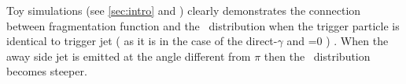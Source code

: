 Toy simulations (see \ref{sec:intro} and ) clearly demonstrates the connection between fragmentation function and the \xe\ distribution when the trigger  particle is identical to trigger jet ( as it is in the case of the direct-$\gamma$ and \kt{}=0 \gevc) . When the away side jet is emitted at the angle different from $\pi$ then the \xe\ distribution becomes steeper. 
\begin{figure}[htbp]
   \centering

\end{figure}
